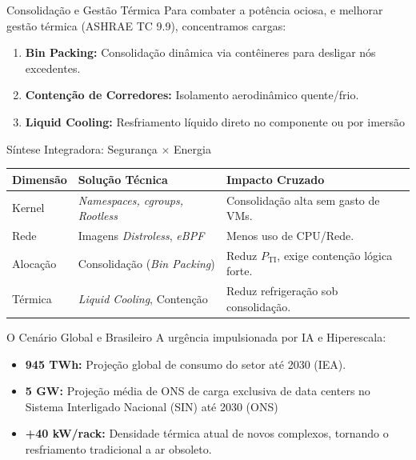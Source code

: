 \documentclass[aspectratio=169]{beamer}
\begin{document}
\begin{frame}{Consolidação e Gestão Térmica}
    Para combater a potência ociosa, e melhorar gestão térmica (ASHRAE TC 9.9), concentramos cargas:
    \vspace{0.5cm}
    \begin{enumerate}
        \item \textbf{Bin Packing:} Consolidação dinâmica via contêineres para desligar nós excedentes.
        \item \textbf{Contenção de Corredores:} Isolamento aerodinâmico quente/frio.
        \item \textbf{Liquid Cooling:} Resfriamento líquido direto no componente ou por imersão
    \end{enumerate}
    
\end{frame}

\begin{frame}{Síntese Integradora: Segurança $\times$ Energia}
    \small
    \renewcommand{\arraystretch}{1.3}
    \begin{tabularx}{\textwidth}{@{}l X X@{}}
        \toprule
        \textbf{Dimensão} & \textbf{Solução Técnica} & \textbf{Impacto Cruzado} \\
        \midrule
        Kernel & \textit{Namespaces, cgroups, Rootless} & Consolidação alta sem gasto de VMs. \\
        Rede & Imagens \textit{Distroless}, \textit{eBPF} & Menos uso de CPU/Rede. \\
        Alocação & Consolidação (\textit{Bin Packing}) & Reduz $P_{\text{TI}}$, exige contenção lógica forte. \\
        Térmica & \textit{Liquid Cooling}, Contenção & Reduz refrigeração sob consolidação. \\
        \bottomrule
    \end{tabularx}
\end{frame}

\begin{frame}{O Cenário Global e Brasileiro}
    A urgência impulsionada por IA e Hiperescala:
    \vspace{0.5cm}
    \begin{itemize}
        \item \textbf{945 TWh:} Projeção global de consumo do setor até 2030 (IEA).
        \item \textbf{5 GW: } Projeção média de ONS de carga exclusiva de data centers no Sistema Interligado Nacional (SIN) até 2030 (ONS)
        \item \textbf{+40 kW/rack:} Densidade térmica atual de novos complexos, tornando o resfriamento tradicional a ar obsoleto.
    \end{itemize}
    \vspace{0.5cm}
    \centering
\end{frame}
\end{document}

